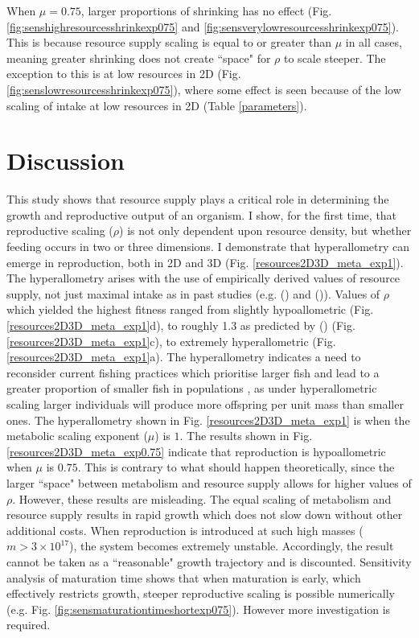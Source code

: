 \documentclass[a4paper, 11pt, hidelinks]{article} %
\newcommand{\authorcite}[1]{\citeauthor{#1} (\citeyear{#1})}
\begin{document}
	When $ \mu = 0.75 $, larger proportions of shrinking has no effect (Fig. \ref{fig:senshighresourcesshrinkexp075} and \ref{fig:sensverylowresourcesshrinkexp075}).  This is because resource supply scaling is equal to or greater than $ \mu $ in all cases, meaning greater shrinking does not create ``space" for $ \rho $ to scale steeper.  The exception to this is at low resources in 2D (Fig. \ref{fig:senslowresourcesshrinkexp075}), where some effect is seen because of the low scaling of intake at low resources in 2D (Table \ref{parameters}).

	
\section{Discussion}
	This study shows that resource supply plays a critical role in determining the growth and reproductive output of an organism.  I show, for the first time, that reproductive scaling ($ \rho $) is not only dependent upon resource density, but whether feeding occurs in two or three dimensions.  
	I demonstrate that hyperallometry can emerge in reproduction, both in 2D and 3D (Fig. \ref{resources2D3D_meta_exp1}).  The hyperallometry arises with the use of empirically derived values of resource supply, not just maximal intake as in past studies (e.g. \authorcite{West2001} and \authorcite{Hou2008}).  Values of $ \rho $ which yielded the highest fitness ranged from slightly hypoallometric (Fig. \ref{resources2D3D_meta_exp1}d), to roughly 1.3 as predicted by \citeauthor{Barneche2018} (\citeyear{Barneche2018}) (Fig. \ref{resources2D3D_meta_exp1}c), to extremely hyperallometric (Fig. \ref{resources2D3D_meta_exp1}a).  The hyperallometry indicates a need to reconsider current fishing practices which prioritise larger fish and lead to a greater proportion of smaller fish in populations \parencite{Heino2013}, as under hyperallometric scaling larger individuals will produce more offspring per unit mass than smaller ones.  The hyperallometry shown in Fig. \ref{resources2D3D_meta_exp1} is when the metabolic scaling exponent ($ \mu $) is $ 1 $.
	The results shown in Fig. \ref{resources2D3D_meta_exp0.75} indicate that reproduction is hypoallometric when $ \mu $ is $ 0.75 $.  This is contrary to what should happen theoretically, since the larger ``space" between metabolism and resource supply allows for higher values of $ \rho $. However, these results are misleading.  The equal scaling of metabolism and resource supply results in rapid growth which does not slow down without other additional costs.  When reproduction is introduced at such high masses ($ m > 3\times 10^{17} $), the system becomes extremely unstable.  Accordingly, the result cannot be taken as a ``reasonable" growth trajectory and is discounted.  Sensitivity analysis of maturation time shows that when maturation is early, which effectively restricts growth, steeper reproductive scaling is possible numerically (e.g. Fig. \ref{fig:sensmaturationtimeshortexp075}).  However more investigation is required.
\end{document}
